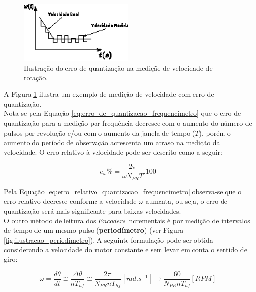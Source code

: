 \begin{figure}[H]
    \centering
    \includegraphics[width=0.5\textwidth]{imagens/ilustracoes/ilustracao_erro_de_quantizacao.eps}
    \caption{Ilustração do erro de quantização na medição de velocidade de rotação.}
    \label{fig:ilustracao_erro_quantizacao}
\end{figure}

A Figura \ref{fig:ilustracao_erro_quantizacao} ilustra um exemplo de medição de velocidade com erro de quantização.\\

Nota-se pela Equação \ref{eq:erro_de_quantizacao_frequencimetro} que o erro de quantização para a medição por frequência decresce com o aumento do número de pulsos por revolução e/ou com o aumento da janela de tempo ($T$), porém o aumento do período de observação acrescenta um atraso na medição da velocidade. O erro relativo à velocidade pode ser descrito como a seguir:

\begin{equation}
    e_{\omega}\% = \frac{2\pi}{\omega N_{PR} T}.100
    \label{eq:erro_relativo_quantizacao_frequencimetro}
\end{equation}

Pela Equação \ref{eq:erro_relativo_quantizacao_frequencimetro} observa-se que o erro relativo decresce conforme a velocidade $\omega$ aumenta, ou seja, o erro de quantização será mais significante para baixas velocidades.\\

O outro método de leitura dos \emph{Encoders} incrementais é por medição de intervalos de tempo de um mesmo pulso (\textbf{periodímetro}) (ver Figura \ref{fig:ilustracao_periodimetro}). A seguinte formulação pode ser obtida considerando a velocidade do motor constante e sem levar em conta o sentido de giro:

\begin{equation}
    \omega = \frac{d\theta}{dt} \cong \frac{\Delta{\theta}}{nT_{hf}} \cong \frac{2\pi}{N_{PR} n T_{hf}} [rad.s^{-1}] \xrightarrow{} \frac{60}{N_{PR} n T_{hf}} [RPM]
    \label{eq:omega_periodimetro}
\end{equation}

